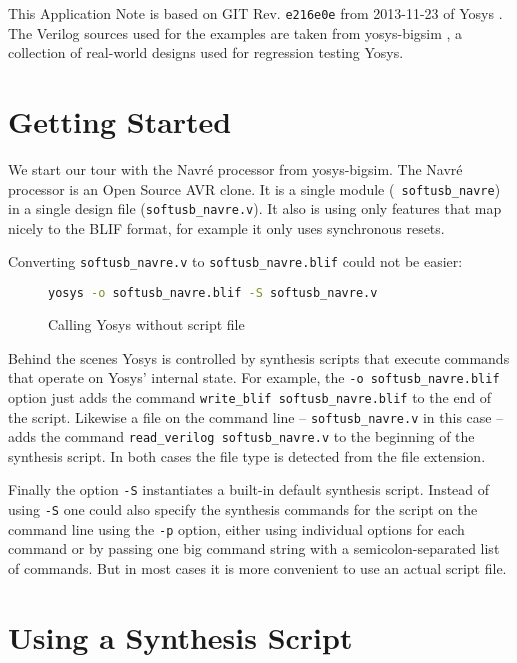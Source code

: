 \documentclass[9pt,technote,a4paper]{IEEEtran}
\begin{document}
\bigskip

This Application Note is based on GIT Rev. {\tt e216e0e} from 2013-11-23 of
Yosys \cite{yosys}. The Verilog sources used for the examples are taken from
yosys-bigsim \cite{bigsim}, a collection of real-world designs used for
regression testing Yosys.

\section{Getting Started}

We start our tour with the Navré processor from yosys-bigsim. The Navré
processor \cite{navre} is an Open Source AVR clone. It is a single module ({\tt
softusb\_navre}) in a single design file ({\tt softusb\_navre.v}). It also is
using only features that map nicely to the BLIF format, for example it only
uses synchronous resets.

Converting {\tt softusb\_navre.v} to {\tt softusb\_navre.blif} could not be
easier:

\begin{figure}[H]
\begin{lstlisting}[language=sh]
yosys -o softusb_navre.blif -S softusb_navre.v
\end{lstlisting}
 \renewcommand{\figurename}{Listing}
\caption{Calling Yosys without script file}
\end{figure}

Behind the scenes Yosys is controlled by synthesis scripts that execute
commands that operate on Yosys' internal state. For example, the {\tt -o
softusb\_navre.blif} option just adds the command {\tt write\_blif
softusb\_navre.blif} to the end of the script. Likewise a file on the
command line -- {\tt softusb\_navre.v} in this case -- adds the command
{\tt read\_verilog softusb\_navre.v} to the beginning of the
synthesis script. In both cases the file type is detected from the
file extension.

Finally the option {\tt -S} instantiates a built-in default synthesis script.
Instead of using {\tt -S} one could also specify the synthesis commands
for the script on the command line using the {\tt -p} option, either using
individual options for each command or by passing one big command string
with a semicolon-separated list of commands. But in most cases it is more
convenient to use an actual script file.

\section{Using a Synthesis Script}
\end{document}
